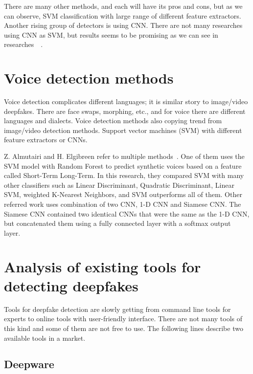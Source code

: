 There are many other methods, and each will have its pros and cons, but as we can observe, SVM classification with large range of different feature extractors. Another rising group of detectors is using CNN. There are not many researches using CNN as SVM, but results seems to be promising as we can see in researches~\cite{3DCNNArchitecturesAndAttentionMechanismsForDeepfakeDetection}~\cite{CapsuleForensicsNetworksForDeepfakeDetection}.

\section{Voice detection methods}

Voice detection complicates different languages; it is similar story to image/video deepfakes. There are face swaps, morphing, etc., and for voice there are different languages and dialects. Voice detection methods also copying trend from image/video detection methods. Support vector machines (SVM) with different feature extractors or CNNs.

Z. Almutairi and H. Elgibreen refer to multiple methods~\cite{ReviewOfModernAudioDeepfakeDetectionMethods}. One of them uses the SVM model with Random Forest to predict synthetic voices based on a feature called Short-Term Long-Term. In this research, they compared SVM with many other classifiers such as Linear Discriminant, Quadratic Discriminant, Linear SVM, weighted K-Nearest Neighbors, and SVM outperforms all of them. Other referred work uses combination of two CNN, 1-D CNN and Siamese CNN. The Siamese CNN contained two identical CNNs that were the same as the 1-D CNN, but concatenated them using a fully connected layer with a softmax output layer.~\cite{ReviewOfModernAudioDeepfakeDetectionMethods}

\section{Analysis of existing tools for detecting deepfakes}

Tools for deepfake detection are slowly getting from command line tools for experts to online tools with user-friendly interface. There are not many tools of this kind and some of them are not free to use. The following lines describe two available tools in a market.

\subsection{Deepware}


